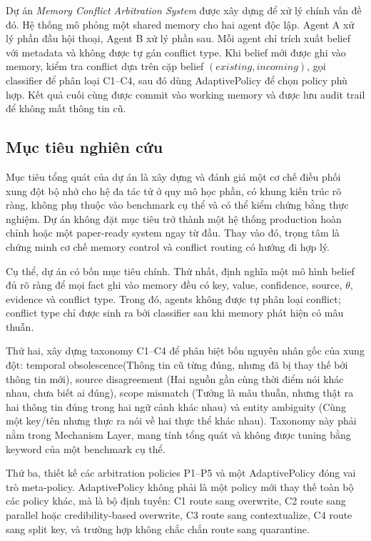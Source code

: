 \documentclass[12pt,a4paper]{article}
\begin{document}
Dự án \textit{Memory Conflict Arbitration System} được xây dựng để xử lý chính vấn đề đó. Hệ thống mô phỏng một shared memory cho hai agent độc lập. Agent A xử lý phần đầu hội thoại, Agent B xử lý phần sau. Mỗi agent chỉ trích xuất belief với metadata và không được tự gán conflict type. Khi belief mới được ghi vào memory, kiểm tra conflict dựa trên cặp belief \((existing, incoming)\), gọi classifier để phân loại C1--C4, sau đó dùng AdaptivePolicy để chọn policy phù hợp. Kết quả cuối cùng được commit vào working memory và được lưu audit trail để không mất thông tin cũ.

\subsection{Mục tiêu nghiên cứu}

Mục tiêu tổng quát của dự án là xây dựng và đánh giá một cơ chế điều phối xung đột bộ nhớ cho hệ đa tác tử ở quy mô học phần, có khung kiến trúc rõ ràng, không phụ thuộc vào benchmark cụ thể và có thể kiểm chứng bằng thực nghiệm. Dự án không đặt mục tiêu trở thành một hệ thống production hoàn chỉnh hoặc một paper-ready system ngay từ đầu. Thay vào đó, trọng tâm là chứng minh cơ chế memory control và conflict routing có hướng đi hợp lý.

Cụ thể, dự án có bốn mục tiêu chính. Thứ nhất, định nghĩa một mô hình belief đủ rõ ràng để mọi fact ghi vào memory đều có key, value, confidence, source, \(\theta\), evidence và conflict type. Trong đó, agents không được tự phân loại conflict; conflict type chỉ được sinh ra bởi classifier sau khi memory phát hiện có mâu thuẫn.

Thứ hai, xây dựng taxonomy C1--C4 để phân biệt bốn nguyên nhân gốc của xung đột: temporal obsolescence(Thông tin cũ từng đúng, nhưng đã bị thay thế bởi thông tin mới), source disagreement (Hai nguồn gần cùng thời điểm nói khác nhau, chưa biết ai đúng), scope mismatch (Tưởng là mâu thuẫn, nhưng thật ra hai thông tin đúng trong hai ngữ cảnh khác nhau) và entity ambiguity (Cùng một key/tên nhưng thực ra nói về hai thực thể khác nhau). Taxonomy này phải nằm trong Mechanism Layer, mang tính tổng quát và không được tuning bằng keyword của một benchmark cụ thể.

Thứ ba, thiết kế các arbitration policies P1--P5 và một AdaptivePolicy đóng vai trò meta-policy. AdaptivePolicy không phải là một policy mới thay thế toàn bộ các policy khác, mà là bộ định tuyến: C1 route sang overwrite, C2 route sang parallel hoặc credibility-based overwrite, C3 route sang contextualize, C4 route sang split key, và trường hợp không chắc chắn route sang quarantine.
\end{document}
